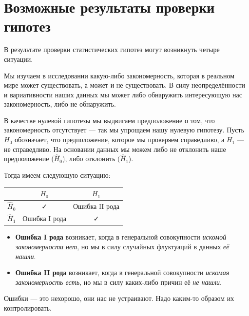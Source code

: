 \documentclass[
  letterpaper,
  DIV=11,
  numbers=noendperiod]{scrreprt}
\providecommand{\tightlist}{%
  \setlength{\itemsep}{0pt}\setlength{\parskip}{0pt}}\usepackage{longtable,booktabs,array}
\theoremstyle{definition}
\theoremstyle{remark}
\begin{document}
\section{Возможные результаты проверки
гипотез}\label{stats-testing-results}

В результате проверки статистических гипотез могут возникнуть четыре
ситуации.

Мы изучаем в исследовании какую-либо закономерность, которая в реальном
мире может существовать, а может и не существовать. В силу
неопределённости и вариативности наших данных мы может либо обнаружить
интересующую нас закономерность, либо не обнаружить.

В качестве нулевой гипотезы мы выдвигаем предположение о том, что
закономерность отсутствует --- так мы упрощаем нашу нулевую гипотезу.
Пусть \(H_0\) обозначает, что предположение, которое мы проверяем
справедливо, а \(H_1\) --- не справедливо. На основании данных мы можем
либо не отклонить наше предположение (\(\hat H_0\)), либо отклонить
(\(\hat H_1\)).

Тогда имеем следующую ситуацию:

\begin{longtable}[]{@{}ccc@{}}
\toprule\noalign{}
& \(H_0\) & \(H_1\) \\
\midrule\noalign{}
\endhead
\bottomrule\noalign{}
\endlastfoot
\(\hat H_0\) & ✓ & Ошибка II рода \\
\(\hat H_1\) & Ошибка I рода & ✓ \\
\end{longtable}

\begin{itemize}
\tightlist
\item
  \textbf{Ошибка I рода} возникает, когда в генеральной совокупности
  \emph{искомой закономерности нет}, но мы в силу случайных флуктуаций в
  данных \emph{её нашли}.
\item
  \textbf{Ошибка II рода} возникает, когда в генеральной совокупности
  \emph{искомая закономерность есть}, но мы в силу каких-либо причин её
  \emph{не нашли}.
\end{itemize}

Ошибки --- это нехорошо, они нас не устраивают. Надо каким-то образом их
контролировать.
\end{document}
